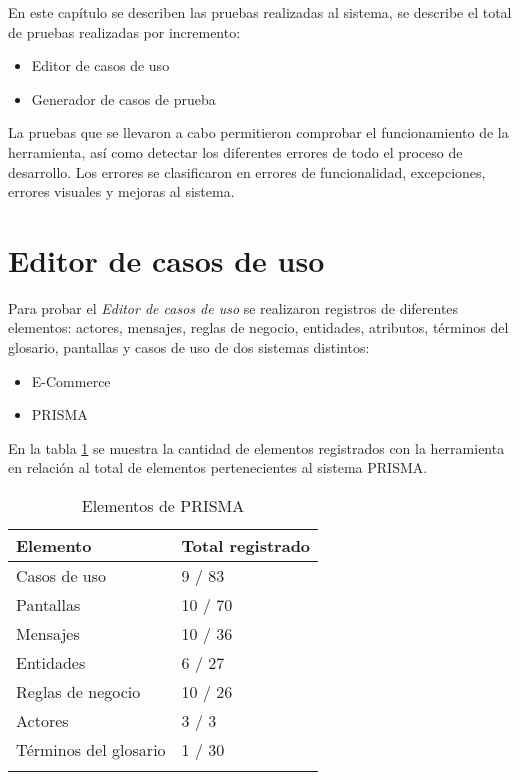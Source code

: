 En este capítulo se describen las pruebas realizadas al sistema, se describe el total de pruebas realizadas por incremento:
\begin{itemize}
 \item Editor de casos de uso
 \item Generador de casos de prueba 
\end{itemize}

La pruebas que se llevaron a cabo permitieron comprobar el funcionamiento de la herramienta, así como detectar los diferentes errores de todo el proceso de desarrollo. 
Los errores se clasificaron en errores de funcionalidad, excepciones, errores visuales y mejoras al sistema.\\

\section{Editor de casos de uso}

Para probar el {\it Editor de casos de uso} se realizaron registros de diferentes elementos: actores, mensajes, reglas de negocio, entidades, atributos, términos del glosario, pantallas y casos de uso de
dos sistemas distintos:

\begin{itemize}
 \item E-Commerce
 \item PRISMA
\end{itemize}

En la tabla \ref{tabla:vectorEditor} se muestra la cantidad de elementos registrados con la herramienta en relación al total de elementos pertenecientes al sistema PRISMA.

\begin{longtable}{| p{} | p{} |}%
	\arrayrulecolor{black}%
	\rowcolor{black}%
	{\color{white}Elemento} & {\color{white}Total registrado}\\ \hline
	\endhead%
	\arrayrulecolor{black}%
	Casos de uso & 9 / 83 \\ \hline
	Pantallas & 10 / 70 \\ \hline
	Mensajes & 10 / 36 \\ \hline
	Entidades & 6 / 27 \\ \hline
	Reglas de negocio & 10 / 26 \\ \hline
	Actores & 3 / 3 \\ \hline
	Términos del glosario  & 1 / 30 \\ \hline
	\caption{Elementos de PRISMA}\label{tabla:vectorEditor}
\end{longtable}%


